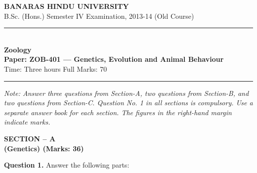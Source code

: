 \documentclass[11pt,a4paper]{article}
\begin{document}
\begin{center}
  {\large\bfseries BANARAS HINDU UNIVERSITY}\\[2pt]
  {\normalsize B.Sc. (Hons.) Semester IV Examination, 2013-14 (Old Course)}\\[6pt]
  \rule{0.8\linewidth}{0.5pt}\\[6pt]
  {\large\bfseries Zoology}\\[4pt]
  {\large\bfseries Paper: ZOB-401 --- Genetics, Evolution and Animal Behaviour}\\[4pt]
  {\normalsize Time: Three hours \hfill Full Marks: 70}
\end{center}

\rule{\linewidth}{0.4pt}

\smallskip



\noindent   \textit{Note: Answer three questions from Section-A, two questions from Section-B, and two questions from Section-C. Question No. 1 in all sections is compulsory. Use a separate answer book for each section. The figures in the right-hand margin indicate marks.}

\bigskip

\begin{center}
   \textbf{SECTION -- A} \\
   \textbf{(Genetics) (Marks: 36)}
\end{center}

\medskip


\noindent   \textbf{Question 1.} Answer the following parts:
\end{document}
